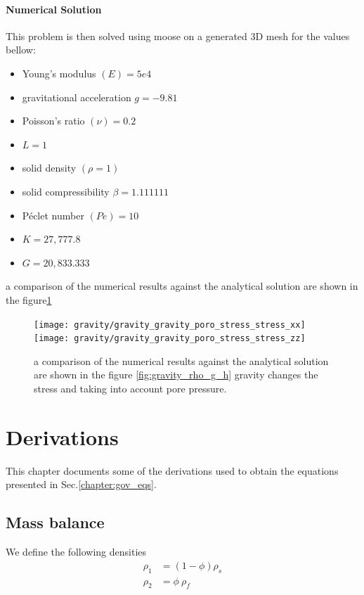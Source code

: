 \documentclass[]{scrreprt}
\begin{document}
\subsubsection{Numerical Solution}
This problem is then solved using moose on a generated 3D mesh for the values bellow:
\begin{itemize}
\item Young's modulus $(E)=5e4$\
\item gravitational acceleration $g =-9.81$\
\item Poisson's ratio $(\nu) =0.2$\
\item $L=1$\
\item  solid density $(\rho=1)$\
\item solid compressibility $\beta=1.111111$ 
\item P\'{e}clet number $(Pe)=10$\ 
\item $K=27,777.8$
\item $G=20,833.333$
\end{itemize}
 a comparison of the numerical results against the analytical solution are shown in the figure\ref{fig:gravity_Poro_stress}
 \begin{figure}
  \centering
  \texttt{[image: gravity/gravity\_gravity\_poro\_stress\_stress\_xx]}
  \texttt{[image: gravity/gravity\_gravity\_poro\_stress\_stress\_zz]}\\
  \caption{ a comparison of the numerical results against the analytical solution are shown in the figure \ref{fig:gravity_rho_g_h} gravity changes the stress and taking into account pore pressure. }
  \label{fig:gravity_Poro_stress}
\end{figure}

\appendix
\chapter{Derivations}
\label{chapter:derivations}
This chapter documents some of the derivations used to obtain the equations presented in Sec.\ref{chapter:gov_eqs}.

\section{Mass balance}
\label{sec:mass_balance}
We define the following densities
\begin{subequations}
  \label{eq:rho_1_rho_2}
  \begin{align}
    \rho_1 &= (1-\phi)\rho_s \\
    \rho_2 &= \phi \: \rho_f  
  \end{align}
\end{subequations}
\end{document}
